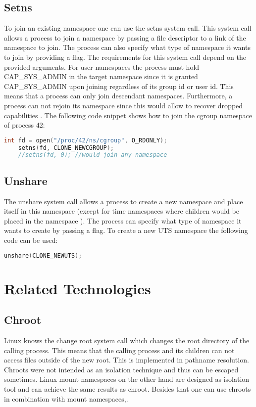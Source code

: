 \documentclass[10pt,twocolumn,a4paper]{article}
\begin{document}
\subsection{ Setns}
To join an existing namespace one can use the setns system call.
This system call allows a process to join a namespace by passing a file descriptor to a link of
the namespace to join. 
The process can also specify what type of namespace it wants to join by providing a flag. 
The requirements for this system call depend on the provided arguments. For user namespaces the process
must hold CAP\_SYS\_ADMIN in the target namespace since it is granted CAP\_SYS\_ADMIN upon joining
regardless of its group id or user id. This means that a process can only
join descendant namespaces. Furthermore, a process can not rejoin its namespace since this would allow to recover dropped capabilities \cite{23}. The following code snippet shows how to join the
cgroup namespace of process 42:
\begin{lstlisting}[language=C]
    int fd = open("/proc/42/ns/cgroup", O_RDONLY);
    setns(fd, CLONE_NEWCGROUP);
    //setns(fd, 0); //would join any namespace
\end{lstlisting}


\subsection{ Unshare}
The unshare system call allows a process to create a new namespace and place itself in this
namespace (except for time namespaces where children would be placed in the namespace \cite{15}). 
The process can specify what type of namespace it wants to create by passing a flag. To create a new
UTS namespace the following code can be used:
\begin{lstlisting}[language=C]
    unshare(CLONE_NEWUTS);
\end{lstlisting}\cite{24}
\section{Related Technologies}\label{sec:related}
\subsection{Chroot}
Linux knows the change root system call which changes the root directory of the calling
process. This means that the calling process and its children can not access files outside of the
new root. This is implemented in pathname resolution\cite{1}. Chroots were not intended as
an isolation technique and thus can be escaped sometimes. Linux mount namespaces on the other hand are designed as isolation tool and can achieve the same results as chroot. Besides that one can use
chroots in combination with mount namespaces\cite{1},\cite{25}. 
\end{document}
